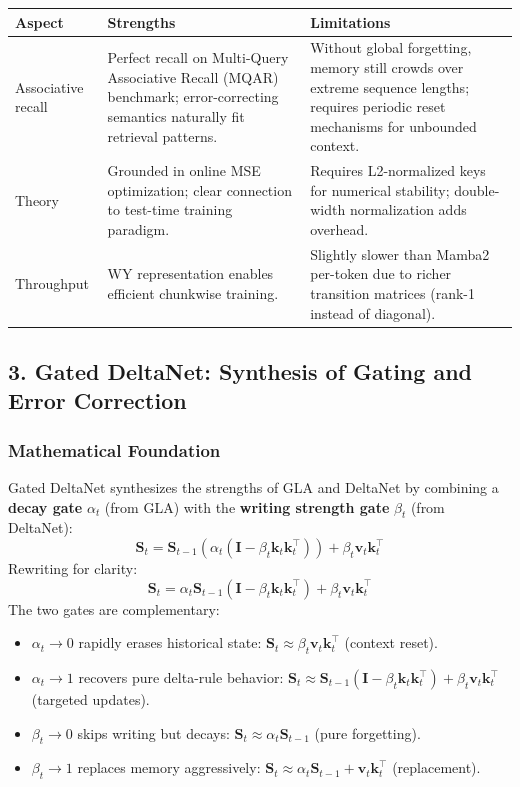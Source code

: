\documentclass[11pt,a4paper]{article}
\begin{document}
\begin{table}[H]
\centering
\small
\begin{tabularx}{0.95\linewidth}{Xp{4cm}p{4cm}}
\toprule
\textbf{Aspect} & \textbf{Strengths} & \textbf{Limitations} \\
\midrule
Associative recall & Perfect recall on Multi-Query Associative Recall (MQAR) benchmark; error-correcting semantics naturally fit retrieval patterns. & Without global forgetting, memory still crowds over extreme sequence lengths; requires periodic reset mechanisms for unbounded context. \\
Theory & Grounded in online MSE optimization; clear connection to test-time training paradigm. & Requires L2-normalized keys for numerical stability; double-width normalization adds overhead. \\
Throughput & WY representation enables efficient chunkwise training. & Slightly slower than Mamba2 per-token due to richer transition matrices (rank-1 instead of diagonal). \\
\bottomrule
\end{tabularx}
\end{table}

\subsection{3. Gated DeltaNet: Synthesis of Gating and Error Correction}

\subsubsection{Mathematical Foundation}

Gated DeltaNet \citep{yang_gated_deltanet_2024} synthesizes the strengths of GLA and DeltaNet by combining a \textbf{decay gate} $\alpha_t$ (from GLA) with the \textbf{writing strength gate} $\beta_t$ (from DeltaNet):
\[
\mathbf{S}_t = \mathbf{S}_{t-1}\left(\alpha_t (\mathbf{I} - \beta_t \mathbf{k}_t \mathbf{k}_t^\top)\right) + \beta_t \mathbf{v}_t \mathbf{k}_t^\top
\]
Rewriting for clarity:
\[
\mathbf{S}_t = \alpha_t \mathbf{S}_{t-1}(\mathbf{I} - \beta_t \mathbf{k}_t \mathbf{k}_t^\top) + \beta_t \mathbf{v}_t \mathbf{k}_t^\top
\]
The two gates are complementary:
\begin{itemize}[leftmargin=*]
    \item $\alpha_t \to 0$ rapidly erases historical state: $\mathbf{S}_t \approx \beta_t \mathbf{v}_t \mathbf{k}_t^\top$ (context reset).
    \item $\alpha_t \to 1$ recovers pure delta-rule behavior: $\mathbf{S}_t \approx \mathbf{S}_{t-1}(\mathbf{I} - \beta_t \mathbf{k}_t \mathbf{k}_t^\top) + \beta_t \mathbf{v}_t \mathbf{k}_t^\top$ (targeted updates).
    \item $\beta_t \to 0$ skips writing but decays: $\mathbf{S}_t \approx \alpha_t \mathbf{S}_{t-1}$ (pure forgetting).
    \item $\beta_t \to 1$ replaces memory aggressively: $\mathbf{S}_t \approx \alpha_t \mathbf{S}_{t-1} + \mathbf{v}_t \mathbf{k}_t^\top$ (replacement).
\end{itemize}
\end{document}
